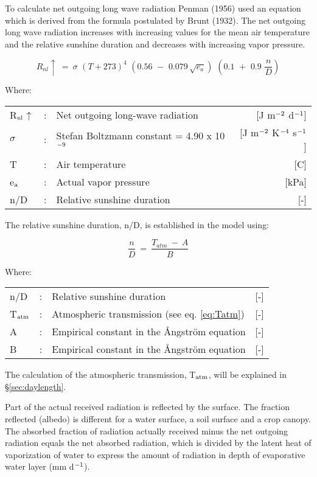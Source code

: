 To calculate net outgoing long wave radiation Penman (1956) used an equation which is
derived from the formula postulated by Brunt (1932). The net outgoing long wave
radiation increases with increasing values for the mean air temperature and the relative
sunshine duration and decreases with increasing vapor pressure.

\begin{equation}
R _{nl} \uparrow  ~=~ \sigma \,\, (T+273) ^{4} \,\, (0.56\,\, -\,\, 0.079\, \sqrt{e _{a} } )\,\, (0.1\,\, +\,\, 0.9\,\,{\frac{n}{D}} )
\end{equation}


Where:\\[5pt]
\begin{tabularx}{\textwidth}{llXr}
	R$_{{\rm nl}}$$\uparrow$ &:& Net outgoing long-wave radiation & [J m$^{{\rm -2}}$ d$^{{\rm -1}}$]\\
	$\sigma$ &:& Stefan Boltzm\-ann constant = 4.90 x 10$^{{\rm -9}}$ & [J m$^{{\rm -2}}$ K$^{{\rm -4}}$ s$^{{\rm -1}}$]\\
	T &:& Air temperature & [\degrees C]\\
	e$_{{\rm a}}$ &:& Actual vapor pressure & [kPa]\\
	n/D &:& Relative sunshine duration & [-]\\
\end{tabularx}

The relative sunshine duration, n/D, is established in the model using:

\begin{equation}
{\frac{n}{D}} ~=~{\frac{T_{atm} ~-~A}{B}}
\end{equation}

Where:\\[5pt]
\begin{tabularx}{\textwidth}{llXr}
	n/D &:& Relative sunshine duration  & [-]\\
	T$_{{\rm atm}}$ &:& Atmospheric transmission (see eq. \ref{eq:Tatm})  & [-]\\
	A &:& Empirical constant in the \AA ngstr\"{o}m equation  & [-]\\
	B &:& Empirical constant in the \AA ngstr\"{o}m equation  & [-]\\
\end{tabularx}


The calculation of the atmospheric transmission, T$_{{\rm atm}}$, will be explained in 
\S \ref{sec:daylength}.

Part of the actual received radiation is reflected by the surface. The fraction reflected
(albedo) is different for a water surface, a soil surface and a crop canopy. The absorbed
fraction of radiation actually received minus the net outgoing radiation equals the net
absorbed radiation, which is divided by the latent heat of vaporization of water to express
the amount of radiation in depth of evaporative water layer (mm d$^{{\rm -1}}$).

